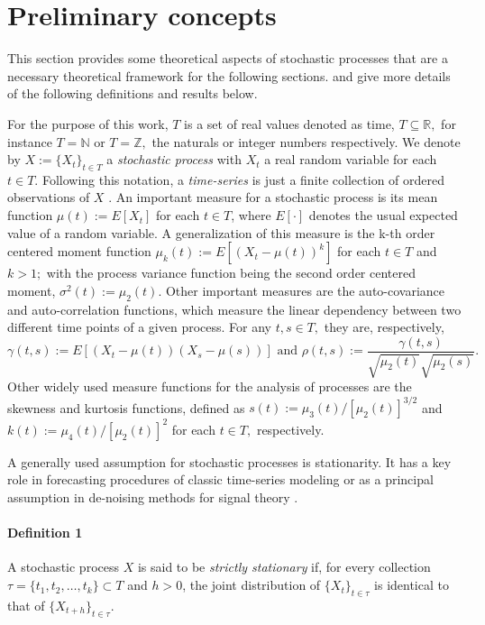 \section{Preliminary concepts}\label{preliminary-concepts}

This section provides some theoretical aspects of stochastic processes that are a necessary theoretical framework for the following sections. \citet{shumway2010} and \citet{Ts2010} give more details of the following definitions and results below.

For the purpose of this work, \(T\) is a set of real values denoted as time, \(T \subseteq \mathbb{R},\) for instance \(T=\mathbb{N}\) or \(T=\mathbb{Z},\) the naturals or integer numbers respectively. We denote by \(X:=\{X_t\}_{t\in T}\) a \textit{stochastic process} with \(X_t\) a real random variable for each \(t\in T.\) Following this notation, a \textit{time-series} is just a finite collection of ordered observations of \(X\) \citep{shumway2010}. An important measure for a stochastic process is its mean function \(\mu(t) := E[X_t]\) for each \(t \in T\), where \(E[\cdot]\) denotes the usual expected value of a random variable. A generalization of this measure is the k-th order centered moment function \(\mu_k(t) := E[(X_t -\mu(t))^k]\) for each \(t \in T\) and \(k > 1;\) with the process variance function being the second order centered moment, \(\sigma^2(t) := \mu_2(t)\). Other important measures are the auto-covariance and auto-correlation functions, which measure the linear dependency between two different time points of a given process. For any \(t,s \in T,\) they are, respectively,
\[
\gamma(t,s) := E[(X_t -\mu(t))(X_s - \mu(s))] \mbox{ and } \rho(t,s) := \dfrac{\gamma(t,s)}{\sqrt{\mu_2(t)}\sqrt{\mu_2(s)}}.
\]
Other widely used measure functions for the analysis of processes are the skewness and kurtosis functions, defined as \(s(t) := \mu_3(t)/[\mu_2(t)]^{3/2}\) and \(k(t) := \mu_4(t)/[\mu_2(t)]^2\) for each \(t\in T,\) respectively.

A generally used assumption for stochastic processes is stationarity. It has a key role in forecasting procedures of classic time-series modeling \citep{Ts2010} or as a principal assumption in de-noising methods for signal theory \citep{W2006}.

\paragraph{Definition 1}\label{definition-1}

A stochastic process \(X\) is said to be \emph{strictly stationary} if, for every collection \(\tau = \{t_1,t_2,\ldots, t_k\} \subset T\) and \(h > 0\), the joint distribution of \(\{X_t\}_{t \in \tau}\) is identical to that of \(\{X_{t+h}\}_{t \in \tau}.\)

